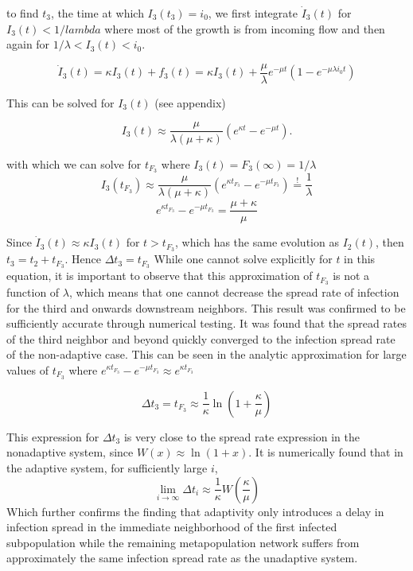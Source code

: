to find $t_3$, the time at which $I_3(t_3) = i_0$, we first integrate  $\dot I_3(t)$ for $I_3(t)<1/lambda$ where most of the growth is from incoming flow and then again for $1/\lambda<I_3(t)<i_0$.

\begin{equation}\dot I_3(t) = \kappa I_3(t) + f_3(t) = \kappa I_3(t) +\frac{\mu}{\lambda} e^{-\mu t}  \left(1-e^{-\mu \lambda i_0 t}\right)\end{equation}

This can be solved for $I_3(t)$ (see appendix)

\begin{equation}
    I_3(t) \approx \frac{\mu}{\lambda (\mu + \kappa)} \left( e^{\kappa t} - e^{-\mu t} \right).
\end{equation}

with which we can solve for $t_{F_3}$ where $I_3(t)=F_3(\infty) = 1/\lambda$
\begin{equation}I_3(t_{F_3}) \approx \frac{\mu}{\lambda (\mu + \kappa)} \left( e^{\kappa t_{F_3}} - e^{-\mu t_{F_3}} \right) \stackrel{!}{=}  \frac{1}{\lambda}\end{equation}
\begin{equation}e^{\kappa t_{F_3}} - e^{-\mu t_{F_3}} =\frac{\mu + \kappa}{\mu}\end{equation}

Since $\dot I_3(t) \approx \kappa I_3(t)$ for $t>t_{F_3}$, which has the same evolution as $I_2(t)$, then $t_3 = t_2 + t_{F_3}$. Hence 
$ \Delta t_3 = t_{F_3}$
While one cannot solve explicitly for $t$ in this equation, it is important to observe that this approximation of $t_{F_3}$ is not a function of $\lambda$, which means that one cannot decrease the spread rate of infection for the third and onwards downstream neighbors. This result was confirmed to be sufficiently accurate through numerical testing. It was found that the spread rates of the third neighbor and beyond quickly converged to the infection spread rate of the non-adaptive case. This can be seen in the analytic approximation for large values of $t_{F_3}$ where $e^{\kappa t_{F_3}} - e^{-\mu t_{F_3}}  \approx e^{\kappa t_{F_3}}$

\begin{equation}\Delta t_3 = t_{F_3} \approx \frac{1}{\kappa} \ln(1+\frac{ \kappa}{\mu})\end{equation}

This expression for $\Delta t_3$ is very close to the spread rate expression in the nonadaptive system, since $W(x) \approx \ln(1+x)$. It is numerically found that in the adaptive system, for sufficiently large $i$, 
\[
\lim_{i \to \infty} \Delta t_i \approx \frac{1}{\kappa} W\left(\frac{\kappa}{\mu}\right)
\]
Which further confirms the finding that adaptivity only introduces a delay in infection spread in the immediate neighborhood of the first infected subpopulation while the remaining metapopulation network suffers from approximately the same infection spread rate as the unadaptive system. 


